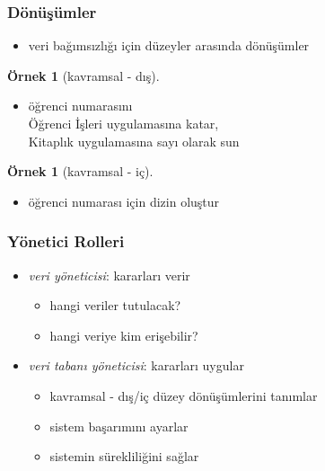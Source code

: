 \documentclass[dvipsnames]{beamer}
\theoremstyle{definition}
\theoremstyle{example}
\newtheorem{ornek}[theorem]{Örnek}
\theoremstyle{plain}
\begin{document}
\begin{frame}
  \frametitle{Dönüşümler}

  \begin{itemize}
    \item veri bağımsızlığı için düzeyler arasında dönüşümler
  \end{itemize}

  \pause
  \begin{ornek}[kavramsal - dış]
    \begin{itemize}
      \item öğrenci numarasını\\
        Öğrenci İşleri uygulamasına katar,\\
        Kitaplık uygulamasına sayı olarak sun
    \end{itemize}
  \end{ornek}

  \pause
  \begin{ornek}[kavramsal - iç]
    \begin{itemize}
      \item öğrenci numarası için dizin oluştur
    \end{itemize}
  \end{ornek}
\end{frame}

\begin{frame}
  \frametitle{Yönetici Rolleri}

  \begin{itemize}
    \item \emph{veri yöneticisi}: kararları verir
    \begin{itemize}
      \item hangi veriler tutulacak?
      \item hangi veriye kim erişebilir?
    \end{itemize}

    \pause
    \bigskip
    \item \emph{veri tabanı yöneticisi}: kararları uygular
    \begin{itemize}
      \item kavramsal - dış/iç düzey dönüşümlerini tanımlar
      \item sistem başarımını ayarlar
      \item sistemin sürekliliğini sağlar
    \end{itemize}
  \end{itemize}
\end{frame}
\end{document}
